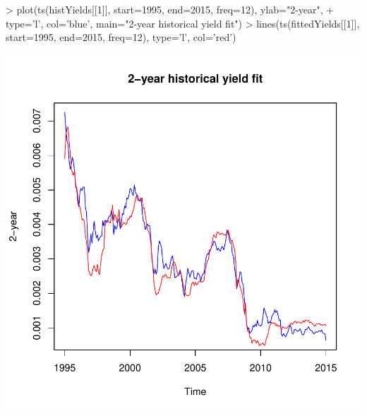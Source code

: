 \documentclass[12pt]{article}
\begin{document}
\begin{Schunk}
\begin{Sinput}
> plot(ts(histYields[[1]], start=1995, end=2015, freq=12), ylab="2-year", 
+   type='l', col='blue', main="2-year historical yield fit")
> lines(ts(fittedYields[[1]], start=1995, end=2015, freq=12), type='l', col='red')
\end{Sinput}
\end{Schunk}
\includegraphics{pricing_kernel_demo-005}
\end{document}

